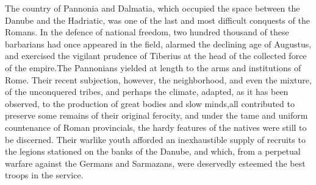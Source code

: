 




The country of Pannonia and Dalmatia, which occupied the space
between the Danube and the Hadriatic, was one of the last and
most difficult conquests of the Romans. In the defence of
national freedom, two hundred thousand of these barbarians had
once appeared in the field, alarmed the declining age of
Augustus, and exercised the vigilant prudence of Tiberius at the
head of the collected force of the empire.\footnotemark[26] The Pannonians
yielded at length to the arms and institutions of Rome. Their
recent subjection, however, the neighborhood, and even the
mixture, of the unconquered tribes, and perhaps the climate,
adapted, as it has been observed, to the production of great
bodies and slow minds,\footnotemark[27] all contributed to preserve some
remains of their original ferocity, and under the tame and
uniform countenance of Roman provincials, the hardy features of
the natives were still to be discerned. Their warlike youth
afforded an inexhaustible supply of recruits to the legions
stationed on the banks of the Danube, and which, from a perpetual
warfare against the Germans and Sarmazans, were deservedly
esteemed the best troops in the service.




